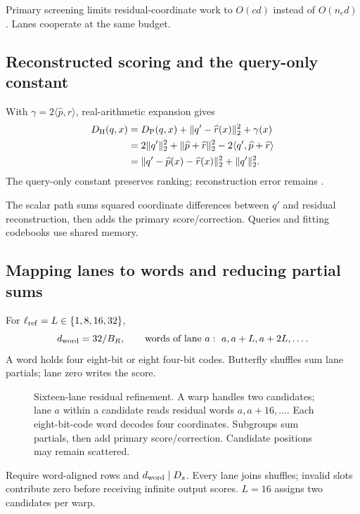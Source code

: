 Primary screening limits residual-coordinate work to $O(cd)$ instead of $O(n_cd)$. Lanes cooperate at the same budget.

\subsection{Reconstructed scoring and the query-only constant}

With $\gamma=2\langle\widehat p,\widehat r\rangle$, real-arithmetic expansion gives
\begin{align}
 D_{\mathrm{H}}(q,x)
 &=D_{\mathrm{P}}(q,x)+\|q'-\widehat r(x)\|_2^2+\gamma(x)
 \label{eq:5-refined-score}\\
 &=2\|q'\|_2^2+\|\widehat p+\widehat r\|_2^2-2\langle q',\widehat p+\widehat r\rangle\nonumber\\
 &=\|q'-\widehat p(x)-\widehat r(x)\|_2^2+\|q'\|_2^2.
 \label{eq:5-refined-constant}
\end{align}
The query-only constant preserves ranking; reconstruction error remains \cite{jhq}.

The scalar path sums squared coordinate differences between $q'$ and residual reconstruction, then adds the primary score/correction. Queries and fitting codebooks use shared memory.

\subsection{Mapping lanes to words and reducing partial sums}

For $\ell_{\mathrm{ref}}=L\in\{1,8,16,32\}$,
\[
 d_{\rm word}=32/B_R,\qquad
 \text{words of lane }a:\ a,a+L,a+2L,\ldots.
\]
A word holds four eight-bit or eight four-bit codes. Butterfly shuffles sum lane partials; lane zero writes the score.

\begin{figure}[tbp]
\centering

\caption[Sixteen-lane residual refinement]{Sixteen-lane residual refinement. A warp handles two candidates;
lane $a$ within a candidate reads residual words $a,a+16,\ldots$.
Each eight-bit-code word decodes four coordinates. Subgroups sum partials, then add primary score/correction. Candidate positions may remain scattered.}
\label{fig:5-lane-refinement}
\end{figure}

Require word-aligned rows and $d_{\rm word}\mid D_s$. Every lane joins shuffles; invalid slots contribute zero before receiving infinite output scores. $L=16$ assigns two candidates per warp.

